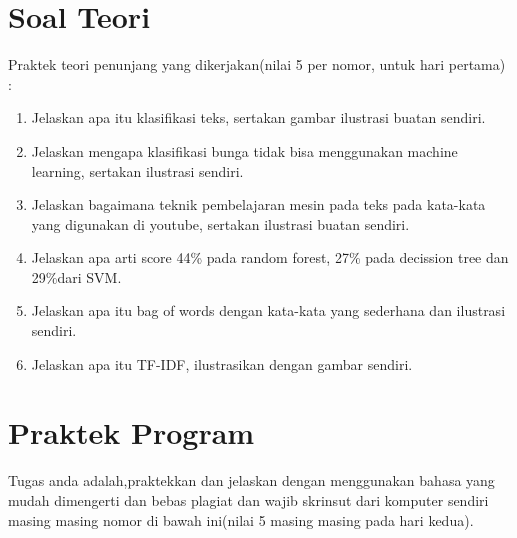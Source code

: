 \section{Soal Teori}
Praktek teori penunjang yang dikerjakan(nilai 5 per nomor, untuk hari pertama) :
\begin{enumerate}
\item
Jelaskan apa itu klasifikasi teks, sertakan gambar ilustrasi buatan sendiri.
\item
Jelaskan mengapa klasifikasi bunga tidak bisa menggunakan machine learning, sertakan ilustrasi sendiri.
\item
Jelaskan bagaimana teknik pembelajaran mesin pada teks pada kata-kata yang digunakan di youtube, sertakan ilustrasi buatan sendiri.
\item
Jelaskan apa arti score 44\% pada random forest, 27\% pada decission tree dan 29\%dari SVM.
\item
Jelaskan apa itu bag of words dengan kata-kata yang sederhana dan ilustrasi sendiri.
\item
Jelaskan apa itu TF-IDF, ilustrasikan dengan gambar sendiri.
\end{enumerate}



\section{Praktek Program}
Tugas anda adalah,praktekkan dan jelaskan dengan menggunakan bahasa yang mudah dimengerti dan bebas plagiat dan wajib skrinsut dari komputer sendiri masing masing nomor di bawah ini(nilai 5 masing masing pada hari kedua).

